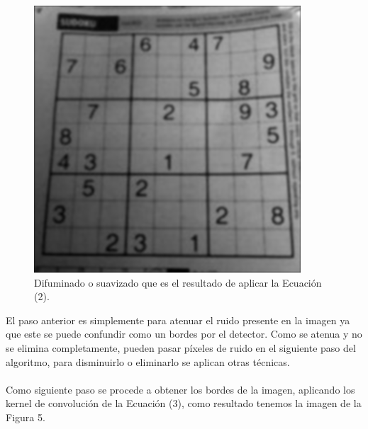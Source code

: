 \documentclass[conference]{IEEEtran}
\begin{document}
\begin{figure}[h]
	\setlength{\unitlength}{0.115in}
	\centering	
	\includegraphics[scale=0.60]{./images/12sudokuBlur.png}
	\caption{Difuminado o suavizado que es el resultado de aplicar la Ecuaci\'on (2).}
\end{figure}
El paso anterior es simplemente para atenuar el ruido presente en la imagen ya que este se puede confundir como un bordes por el detector. Como se atenua y no se elimina completamente, pueden pasar p\'ixeles de ruido en el siguiente paso del algoritmo, para disminuirlo o eliminarlo se aplican otras t\'ecnicas.\\\\
Como siguiente paso se procede a obtener los bordes de la imagen, aplicando los kernel de convoluci\'on de la Ecuaci\'on (3), como resultado tenemos la imagen de la Figura 5.
\end{document}
